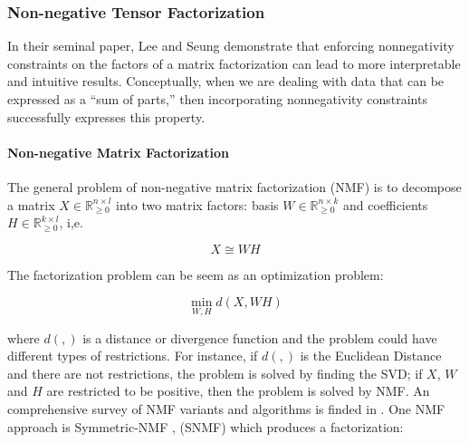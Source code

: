 \documentclass[letterpaper,12pt]{article}
\begin{document}


\subsubsection{Non-negative Tensor Factorization}

In their seminal paper, Lee and Seung \cite{Seung1999} demonstrate that enforcing nonnegativity constraints on the factors of a matrix factorization can lead to more interpretable and intuitive results. Conceptually, when we are dealing with data that can be expressed as a “sum of parts,” then incorporating nonnegativity constraints successfully expresses this property. \cite{Papalexakis2016}


\paragraph{Non-negative Matrix Factorization}

The general problem of non-negative matrix factorization (NMF) is to decompose a matrix $X \in \mathbb{R}_{\geq 0}^{n\times l}$ into two matrix factors: basis $W \in \mathbb{R}_{\geq 0}^{n\times k}$  and coefficients $H \in \mathbb{R}_{\geq 0}^{k\times l}$, i,e.

\begin{equation}
X\cong W H\label{eq:matrix-factorization}
\end{equation}
 
The factorization problem can be seem as an optimization problem:

\begin{equation}
\min_{W,H}d(X,WH)\label{eq:objective-function-factorization}
\end{equation}


where $d(,)$ is a distance or divergence function and the problem could have different types of restrictions. For instance, if $d(,)$
is the Euclidean Distance and there are not restrictions, the problem is solved by finding the SVD; if $X$, $W$ and $H$ are restricted
to be positive, then the problem is solved by NMF. An comprehensive survey of NMF variants and algorithms is finded in \cite{Wang2013}.
One NMF approach is Symmetric-NMF \cite{Ding2005}, (SNMF) which produces a factorization: 
\end{document}
